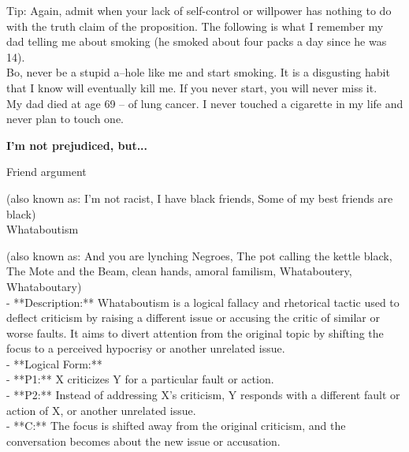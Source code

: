 \documentclass[a4paper,12pt,single,pdftex]{scrbook}
\begin{document}
{    
      Tip: Again, admit when your lack of self-control or willpower has nothing to do with the truth claim of the proposition.  The following is what I remember my dad telling me about smoking (he smoked about four packs a day since he was 14).
    \\

    
      Bo, never be a stupid a--hole like me and start smoking.  It is a disgusting habit that I know will eventually kill me.  If you never start, you will never miss it.
    \\

    
      My dad died at age 69 -- of lung cancer.  I never touched a cigarette in my life and never plan to touch one.
    \\

  }
\par \textbf{I'm not prejudiced, but...}


Friend argument
    
      (also known as: I'm not racist, I have black friends, Some of my best friends are black)
    \\

  

Whataboutism
    
      (also known as: And you are lynching Negroes, The pot calling the kettle black, The Mote and the Beam, clean hands, amoral familism, Whataboutery, Whataboutary)
    \\

  
    
      - **Description:** Whataboutism is a logical fallacy and rhetorical tactic used to deflect criticism by raising a different issue or accusing the critic of similar or worse faults. It aims to divert attention from the original topic by shifting the focus to a perceived hypocrisy or another unrelated issue.
    \\

    
      - **Logical Form:**
    \\

    
        - **P1:** X criticizes Y for a particular fault or action.
    \\

    
        - **P2:** Instead of addressing X's criticism, Y responds with a different fault or action of X, or another unrelated issue.
    \\

    
        - **C:** The focus is shifted away from the original criticism, and the conversation becomes about the new issue or accusation.
    \\
\end{document}
